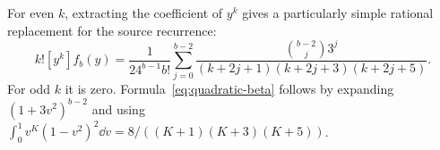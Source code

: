 For even $k$, extracting the coefficient of $y^k$ gives a particularly
simple rational replacement for the source recurrence:
\begin{equation}\label{eq:quadratic-beta}
 k![y^k]f_b(y)=\frac1{24^{b-1}b!}
 \sum_{j=0}^{b-2}
 \frac{\binom{b-2}{j}3^j}{(k+2j+1)(k+2j+3)(k+2j+5)}.
\end{equation}
For odd $k$ it is zero. Formula~\eqref{eq:quadratic-beta} follows by
expanding $(1+3v^2)^{b-2}$ and using
$\int_0^1v^K(1-v^2)^2\dd v=8/((K+1)(K+3)(K+5))$.
